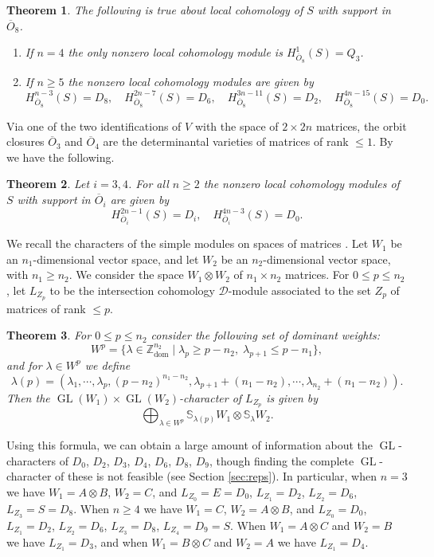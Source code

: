 \documentclass[11pt,reqno]{amsart}
\newcommand{\D}{\mathcal{D}}
\newcommand{\oo}{\otimes}
\newcommand{\bS}{\mathbb{S}}
\newcommand{\GL}{\operatorname{GL}}
\newcommand{\dom}{\operatorname{dom}}
\newcommand{\ol}[1]{\overline{#1}}
\newtheorem{theorem}{Theorem}[section]
\numberwithin{equation}{section}
\begin{document}
\begin{theorem}\label{thm:localcoho8}
The following is true about local cohomology of $S$ with support in $\ol{O}_8$.	
\begin{enumerate}
\item If $n=4$ the only nonzero local cohomology module is $H^1_{\ol{O}_8}(S)=Q_3$.
\item If $n\geq 5$ the nonzero local cohomology modules are given by
$$
H^{n-3}_{\ol{O}_8}(S)=D_8,\quad H^{2n-7}_{\ol{O}_8}(S)=D_6,\quad H^{3n-11}_{\ol{O}_8}(S)=D_2,\quad H^{4n-15}_{\ol{O}_8}(S)=D_0.
$$
\end{enumerate}
\end{theorem}

Via one of the two identifications of $V$ with the space of $2\times 2n$ matrices, the orbit closures $\overline{O}_3$ and $\ol{O}_4$ are the determinantal varieties of matrices of rank $\leq 1$. By \cite[Main Theorem]{raicu2016ocal} we have the following.
\begin{theorem}\label{thm:localcoho34}
Let $i=3,4$. For all $n\geq 2$ the nonzero local cohomology modules of $S$ with support in $\ol{O}_i$ are given by
$$
H^{2n-1}_{\overline{O}_i}(S)=D_i,\quad H^{4n-3}_{\overline{O}_i}(S)=D_0.
$$
\end{theorem}

We recall the characters of the simple modules on spaces of matrices \cite[Section 3.2]{raicu2016characters}. Let $W_1$ be an $n_1$-dimensional vector space, and let $W_2$ be an $n_2$-dimensional vector space, with $n_1\geq n_2$. We consider the space $W_1\oo W_2$ of $n_1\times n_2$ matrices. For $0\leq p\leq n_2$, let $L_{Z_p}$ to be the intersection cohomology $\D$-module associated to the set $Z_p$ of matrices of rank $\leq p$.
\begin{theorem}\label{thm:charMatrices}
For $0\leq p\leq n_2$ consider the following set of dominant weights:
$$
W^p=\{\lambda\in \mathbb{Z}^{n_2}_{\dom}\mid \lambda_p\geq p-n_2,\; \lambda_{p+1}\leq p-n_1\},
$$
and for $\lambda\in W^p$ we define
$$
\lambda(p)=(\lambda_1,\cdots,\lambda_p,(p-n_2)^{n_1-n_2},\lambda_{p+1}+(n_1-n_2),\cdots,\lambda_{n_2}+(n_1-n_2)).
$$
Then the $\GL(W_1)\times \GL(W_2)$-character of $L_{Z_p}$ is given by
$$
\bigoplus_{\lambda\in W^p} \bS_{\lambda(p)}W_1\oo\bS_{\lambda}W_2.
$$
\end{theorem}
Using this formula, we can obtain a large amount of information about the $\GL$-characters of $D_0$, $D_2$, $D_3$, $D_4$, $D_6$, $D_8$, $D_9$, though finding the complete $\GL$-character of these is not feasible (see Section \ref{sec:reps}).
In particular, when $n=3$ we have $W_1=A\oo B$, $W_2=C$, and $L_{Z_0}=E=D_0$, $L_{Z_1}=D_2$, $L_{Z_2}=D_6$, $L_{Z_3}=S=D_8$. When $n\geq 4$ we have $W_1=C$, $W_2=A\oo B$, and $L_{Z_0}=D_0$, $L_{Z_1}=D_2$, $L_{Z_2}=D_6$, $L_{Z_3}=D_8$, $L_{Z_4}=D_9=S$. When $W_1=A\oo C$ and $W_2=B$ we have $L_{Z_1}=D_3$, and when $W_1=B\oo C$ and $W_2=A$ we have $L_{Z_1}=D_4$. 
\end{document}
